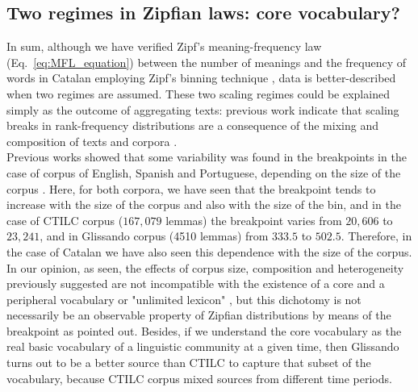 \documentclass[10pt,letterpaper]{article}
\begin{document}
\subsection*{Two regimes in Zipfian laws: core vocabulary?}

In sum, although we have verified Zipf's meaning-frequency law (Eq.~\ref{eq:MFL_equation}) between the number of meanings and the frequency of words in Catalan employing Zipf's binning technique \cite{Zipf_MFL}, data is better-described when two regimes are assumed. 
These two scaling regimes could be explained simply as the outcome of aggregating texts: previous work indicate that scaling breaks in rank-frequency distributions are a consequence of the mixing and composition of texts and corpora \cite{Williams2015}.\\ 

Previous works showed that some variability was found in the breakpoints in the case of corpus of English, Spanish and Portuguese, depending on the size of the corpus \cite{Williams2015}. Here, for both corpora, we have seen that the breakpoint tends to increase with the size of the corpus and also with the size of the bin, and in the case of CTILC corpus ($167,079$ lemmas) the breakpoint varies from $20,606$ to $23,241$, and in Glissando corpus (4510 lemmas) from $333.5$ to $502.5$. Therefore, in the case of Catalan we have also seen this dependence with the size of the corpus. \\

In our opinion, as seen, the effects of corpus size, composition and he\-te\-ro\-ge\-neity previously suggested \cite{MONTEMURRO2001,Williams2015, Ferrer2005variation, baayen2001word} are not incompatible with the existence of a core and a peripheral vocabulary or "unlimited lexicon" \cite{ferrer2001two, GerlachAltmann2013}, but this dichotomy is not necessarily be an observable property of Zipfian distributions by means of the breakpoint as \cite{Williams2015} pointed out. Besides, if we understand the core vocabulary as the real basic vocabulary of a linguistic community at a given time, then Glissando turns out to be a better source than CTILC to capture that subset of the vocabulary, because CTILC corpus mixed sources from different time periods.\\
\end{document}
